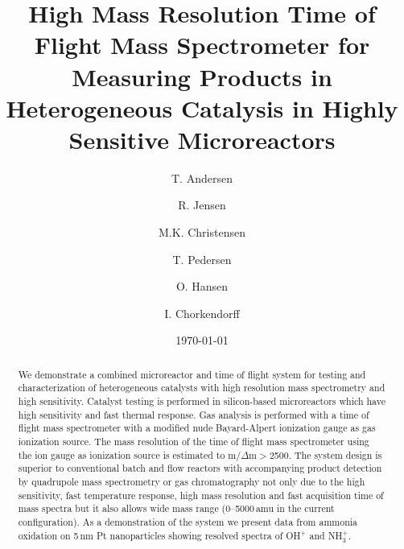 \documentclass[aip,rsi]{revtex4-1}
\begin{document}

\title{High Mass Resolution Time of Flight Mass Spectrometer for Measuring Products in Heterogeneous Catalysis in Highly Sensitive Microreactors} %



\author{T. Andersen}
\author{R. Jensen}
\author{M.K. Christensen}
\author{T. Pedersen}
\author{O. Hansen}
\author{I. Chorkendorff}


\date{\today}

\begin{abstract}
We demonstrate a combined microreactor and time of flight system for testing and characterization of heterogeneous catalysts with high resolution mass spectrometry and high sensitivity. Catalyst testing is performed in silicon-based microreactors which have high sensitivity and fast thermal response. Gas analysis is performed with a time of flight mass spectrometer with a modified nude Bayard-Alpert ionization gauge as gas ionization source. The mass resolution of the time of flight mass spectrometer using the ion gauge as ionization source is estimated to m/$\Delta$m$>$2500. The system design is superior to conventional batch and flow reactors with accompanying product detection by quadrupole mass spectrometry or gas chromatography not only due to the high sensitivity, fast temperature response, high mass resolution and fast acquisition time of mass spectra but it also allows wide mass range (0--5000\,amu in the current configuration). As a demonstration of the system we present data from ammonia oxidation on 5\,nm Pt nanoparticles showing resolved spectra of OH$^{+}$ and NH$_{3}^{+}$.
\end{abstract}
\end{document}
